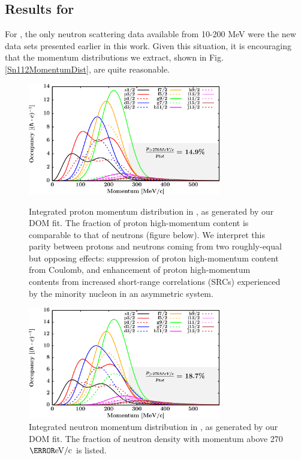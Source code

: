 \subsection{Results for \snTwelve}
For \snTwelve, the only neutron scattering data available from 10-200 MeV were the new data sets
presented earlier in this work. Given this situation, it is encouraging that the momentum
distributions we extract, shown in Fig. \ref{Sn112MomentumDist}, are quite reasonable.
\begin{figure}[tb]
    \centering
    \includegraphics[width=0.75\textwidth]{figures/sn112_protonLJMomentumDistIntegral.png}
    \caption[Proton momentum distribution in \snTwelve]
    {
        Integrated proton momentum distribution in \snTwelve, as generated
        by our DOM fit. The fraction of proton high-momentum content is
        comparable to that of neutrons
        (figure below). We interpret this parity between protons and neutrons coming from two
        roughly-equal but opposing effects: suppression of proton high-momentum content
        from Coulomb, and enhancement of proton high-momentum contents from increased
        short-range correlations (SRCs) experienced by the minority nucleon in an
        asymmetric system.
    }
    \label{sn112ProtonMomentumDistInt}
    \vspace{16pt}
    \includegraphics[width=0.75\textwidth]{figures/sn112_neutronLJMomentumDistIntegral.png}
    \caption[Neutron momentum distributions in \snTwelve]
    {
        Integrated neutron momentum distribution in \snTwelve, as generated
        by our DOM fit. The fraction of neutron density with
        momentum above 270 $\mega\electronvolt/\text{c}$ is listed.
    }
    \label{sn112NeutronMomentumDistInt}
    \label{sn112Momenta}
\end{figure}

